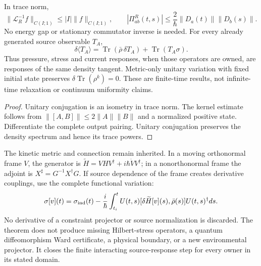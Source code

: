 \documentclass[12pt,a4paper]{article}
\begin{document}
\begin{corollary}
\label{p4:cor:v4104-finite-retarded-source-domain}
In trace norm,
\[
 \|\mathscr L_R^{-1}f\|_{C(I;1)}\le |I|\|f\|_{C(I;1)},\qquad
 |\Pi^R_{ab}(t,s)|\le\frac{2}{\hbar}\|D_a(t)\|\|D_b(s)\|.
\]
No energy gap or stationary commutator inverse is needed.  For every already
generated source observable $T_A$,
\[
 \delta\langle T_A\rangle
 =\operatorname{Tr}(\bar\rho\,\delta T_A)
  +\operatorname{Tr}(T_A\sigma).
\]
Thus pressure, stress and current responses, when those operators are owned,
are responses of the same density tangent.  Metric-only unitary variation with
fixed initial state preserves $\delta\operatorname{Tr}(\rho^k)=0$.
These are finite-time results, not infinite-time relaxation or continuum
uniformity claims.
\end{corollary}
\begin{proof}
Unitary conjugation is an isometry in trace norm.  The kernel estimate follows
from $\|[A,B]\|\le2\|A\|\|B\|$ and a normalized positive state.
Differentiate the complete output pairing.  Unitary conjugation preserves the
density spectrum and hence its trace powers.
\end{proof}

The kinetic metric and connection remain inherited.  In a moving orthonormal
frame $V$, the generator is
$\widetilde H=VHV^\dagger+i\hbar\dot VV^\dagger$; in a nonorthonormal frame
the adjoint is $X^\sharp=G^{-1}X^\dagger G$.  If source dependence of the
frame creates derivative couplings, use the complete functional variation:
\[
 \sigma[v](t)=\sigma_{\rm ind}(t)-\frac{i}{\hbar}
 \int_{t_i}^{t}U(t,s)[\delta\widetilde H[v](s),\bar\rho(s)]
 U(t,s)^\dagger ds.
\]
No derivative of a constraint projector or source normalization is discarded.
The theorem does not produce missing Hilbert-stress operators, a quantum
diffeomorphism Ward certificate, a physical boundary, or a new environmental
projector.  It closes the finite interacting source-response step for every
owner in its stated domain.
\end{document}
